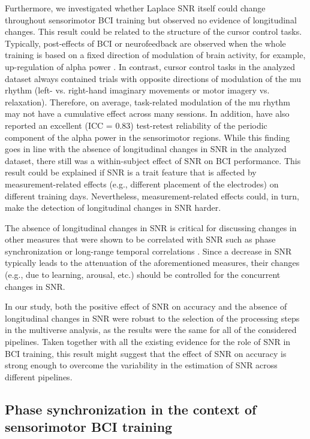 Furthermore, we investigated whether Laplace SNR itself could change throughout sensorimotor BCI training but observed no evidence of longitudinal changes. This result could be related to the structure of the cursor control tasks. Typically, post-effects of BCI or neurofeedback are observed when the whole training is based on a fixed direction of modulation of brain activity, for example, up-regulation of alpha power \citep{Zoefel2011}. In contrast, cursor control tasks in the analyzed dataset always contained trials with opposite directions of modulation of the mu rhythm (left- vs. right-hand imaginary movements or motor imagery vs. relaxation). Therefore, on average, task-related modulation of the mu rhythm may not have a cumulative effect across many sessions. In addition, \cite{Popov2023} have also reported an excellent (ICC = 0.83) test-retest reliability of the periodic component of the alpha power in the sensorimotor regions. While this finding goes in line with the absence of longitudinal changes in SNR in the analyzed dataset, there still was a within-subject effect of SNR on BCI performance. This result could be explained if SNR is a trait feature that is affected by measurement-related effects (e.g., different placement of the electrodes) on different training days. Nevertheless, measurement-related effects could, in turn, make the detection of longitudinal changes in SNR harder.

\medskip

The absence of longitudinal changes in SNR is critical for discussing changes in other measures that were shown to be correlated with SNR such as phase synchronization or long-range temporal correlations \citep{Samek2016, Vidaurre2020}. Since a decrease in SNR typically leads to the attenuation of the aforementioned measures, their changes (e.g., due to learning, arousal, etc.) should be controlled for the concurrent changes in SNR.

\medskip

In our study, both the positive effect of SNR on accuracy and the absence of longitudinal changes in SNR were robust to the selection of the processing steps in the multiverse analysis, as the results were the same for all of the considered pipelines. Taken together with all the existing evidence for the role of SNR in BCI training, this result might suggest that the effect of SNR on accuracy is strong enough to overcome the variability in the estimation of SNR across different pipelines.

\subsection{Phase synchronization in the context of sensorimotor BCI training}

